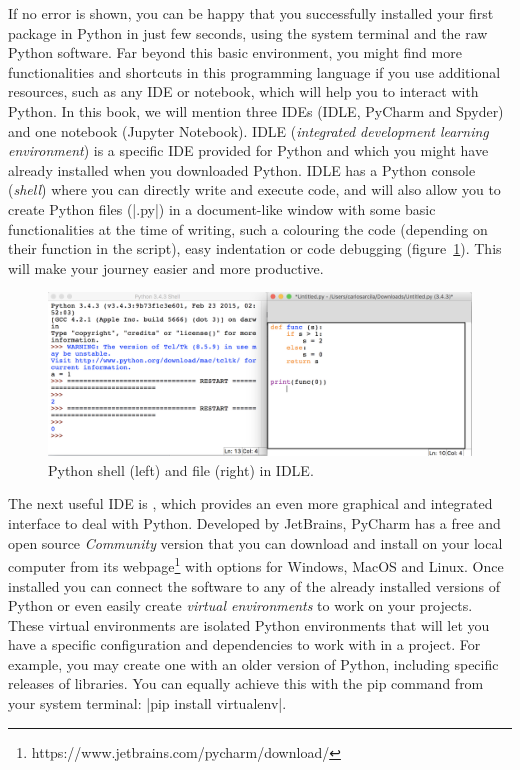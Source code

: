 
If no error is shown, you can be happy that you successfully
installed your first package in Python in just few seconds, using the
system terminal and the raw Python software. Far beyond this basic
environment, you might find more functionalities and shortcuts in this
programming language if you use additional resources, such as any IDE
or notebook, which will help you to interact with Python. In this
book, we will mention three IDEs (IDLE, PyCharm and Spyder) and one
notebook (Jupyter Notebook). IDLE (\emph{integrated development
  learning environment}) is a specific IDE provided for Python and
which you might have already installed when you downloaded
Python. IDLE has a Python console (\emph{shell}) where you can directly
write and execute code, and will also allow you to create Python files
(|.py|) in a document-like window with some basic functionalities at the
time of writing, such a colouring the code (depending on their
function in the script), easy indentation or code debugging
(figure~\ref{fig:python_idle}).  This will make your journey easier
and more productive.

\begin{figure}
\centering
\includegraphics[width=0.9\linewidth]{figures/ch3_python_idle}
\caption{Python shell (left) and file (right) in IDLE.}
\label{fig:python_idle}
\end{figure}

The next useful IDE is , which provides an even more graphical
and integrated interface to deal with Python.  Developed by JetBrains,
PyCharm has a free and open source \emph{Community} version that you
can download and install on your local computer from its
webpage\footnote{https://www.jetbrains.com/pycharm/download/} with
options for Windows, MacOS and Linux. Once installed you can connect
the software to any of the already installed versions of Python or
even easily create \emph{virtual environments} to work on your
projects. These virtual environments are isolated Python environments
that will let you have a specific configuration and dependencies to
work with in a project. For example, you may create one with an older
version of Python, including specific releases of libraries.  You can
equally achieve this with the pip command from your system terminal:
|pip install virtualenv|.
 
